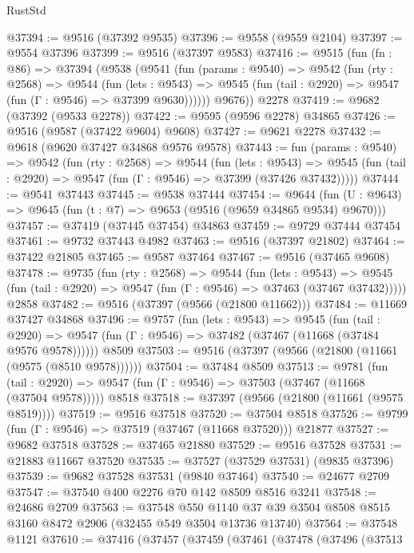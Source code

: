 \begin{lexlean}{RustStd}
\begin{coremodule}
@37394 := @9516 (@37392 @9535)
@37396 := @9558 (@9559 @2104)
@37397 := @9554 @37396
@37399 := @9516 (@37397 @9583)
@37416 := @9515
    (fun (fn : @86) =>
    @37394
      (@9538
        (@9541
          (fun (params : @9540) =>
          @9542
            (fun (rty : @2568) =>
            @9544
              (fun (lets : @9543) =>
              @9545 (fun (tail : @2920) => @9547 (fun (Γ : @9546) => @37399 @9630))))))
        @9676))
    @2278
@37419 := @9682 (@37392 (@9533 @2278))
@37422 := @9595 (@9596 @2278) @34865
@37426 := @9516 (@9587 (@37422 @9604) @9608)
@37427 := @9621 @2278
@37432 := @9618 (@9620 @37427 @34868 @9576 @9578)
@37443 := fun (params : @9540) =>
  @9542
    (fun (rty : @2568) =>
    @9544
      (fun (lets : @9543) =>
      @9545 (fun (tail : @2920) => @9547 (fun (Γ : @9546) => @37399 (@37426 @37432)))))
@37444 := @9541 @37443
@37445 := @9538 @37444
@37454 := @9644
    (fun (U : @9643) => @9645 (fun (t : @7) => @9653 (@9516 (@9659 @34865 @9534) @9670)))
@37457 := @37419 (@37445 @37454) @34863
@37459 := @9729 @37444 @37454
@37461 := @9732 @37443 @4982
@37463 := @9516 (@37397 @21802)
@37464 := @37422 @21805
@37465 := @9587 @37464
@37467 := @9516 (@37465 @9608)
@37478 := @9735
    (fun (rty : @2568) =>
    @9544
      (fun (lets : @9543) =>
      @9545 (fun (tail : @2920) => @9547 (fun (Γ : @9546) => @37463 (@37467 @37432)))))
    @2858
@37482 := @9516 (@37397 (@9566 (@21800 @11662)))
@37484 := @11669 @37427 @34868
@37496 := @9757
    (fun (lets : @9543) =>
    @9545
      (fun (tail : @2920) =>
      @9547 (fun (Γ : @9546) => @37482 (@37467 (@11668 (@37484 @9576 @9578))))))
    @8509
@37503 := @9516 (@37397 (@9566 (@21800 (@11661 (@9575 (@8510 @9578))))))
@37504 := @37484 @8509
@37513 := @9781
    (fun (tail : @2920) => @9547 (fun (Γ : @9546) => @37503 (@37467 (@11668 (@37504 @9578)))))
    @8518
@37518 := @37397 (@9566 (@21800 (@11661 (@9575 @8519))))
@37519 := @9516 @37518
@37520 := @37504 @8518
@37526 := @9799 (fun (Γ : @9546) => @37519 (@37467 (@11668 @37520))) @21877
@37527 := @9682 @37518
@37528 := @37465 @21880
@37529 := @9516 @37528
@37531 := @21883 @11667 @37520
@37535 := @37527 (@37529 @37531) (@9835 @37396)
@37539 := @9682 @37528 @37531 (@9840 @37464)
@37540 := @24677 @2709
@37547 := @37540 @400 @2276 @70 @142 @8509 @8516 @3241
@37548 := @24686 @2709
@37563 := @37548
    @550
    @1140
    @37
    @39
    @3504
    @8508
    @8515
    @3160
    @8472
    @2906
    (@32455 @549 @3504 @13736 @13740)
@37564 := @37548 @1121
@37610 := @37416
    (@37457
      (@37459
        (@37461
          (@37478
            (@37496
              (@37513

\end{coremodule}
\end{lexlean}
